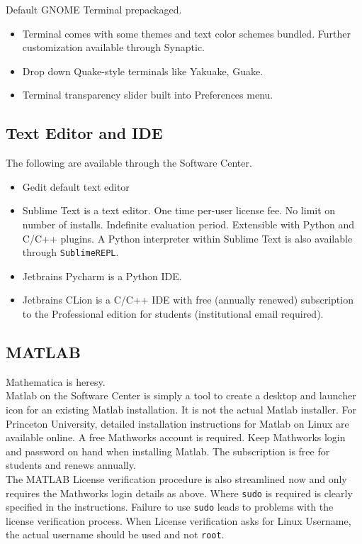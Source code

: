 \documentclass[8pt,letterpaper,twocolumn]{article}
\begin{document}
Default GNOME Terminal prepackaged.

\begin{itemize}
	\item Terminal comes with some themes and text color schemes bundled. Further customization available through Synaptic.
	\item Drop down Quake-style terminals like Yakuake, Guake.
	\item Terminal transparency slider built into Preferences menu.
\end{itemize}

\subsection{Text Editor and IDE}
The following are available through the Software Center.

\begin{itemize}
	\item Gedit default text editor
	\item Sublime Text is a text editor. One time per-user license fee. No limit on number of installs. Indefinite evaluation period. Extensible with Python and C/C++ plugins. A Python interpreter within Sublime Text is also available through \texttt{SublimeREPL}. 
	\item Jetbrains Pycharm is a Python IDE.
	\item Jetbrains CLion is a C/C++ IDE with free (annually renewed) subscription to the Professional edition for students (institutional email required).
\end{itemize}

\subsection{MATLAB}

Mathematica is heresy.\\

Matlab on the Software Center is simply a tool to create a desktop and launcher icon for an existing Matlab installation. It is not the actual Matlab installer.
For Princeton University, detailed installation instructions for Matlab on Linux are available online. A free Mathworks account is required. Keep Mathworks login and password on hand when installing Matlab. The subscription is free for students and renews annually.\\

The MATLAB License verification procedure is also streamlined now and only requires the Mathworks login details as above. Where \texttt{sudo} is required is clearly specified in the instructions. Failure to use \texttt{sudo} leads to problems with the license verification process. When License verification asks for Linux Username, the actual username should be used and not \texttt{root}.\\
\end{document}
